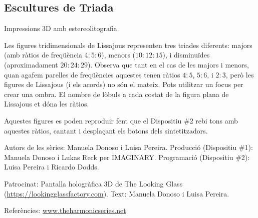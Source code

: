 \subsection{Escultures de Triada}
Impressions 3D amb estereolitografia.

Les figures tridimensionals de Lissajous representen tres triades diferents: majors (amb ràtios de freqüència $4:5:6$), menors ($10:12:15$), i disminuïdes (aproximadament $20:24:29$). Observa que tant en el cas de les majors i menors, quan agafem parelles de freqüències aquestes tenen ràtios $4:5$, $5:6$, i $2:3$, però les figures de Lissajous (i els acords) no són el mateix. Pots utilitzar un focus per crear una ombra. El nombre de lòbuls a cada costat de la figura plana de Lissajous et dóna  les ràtios.

Aquestes figures es poden reproduir fent que el Dispositiu \#2 rebi tons amb aquestes ràtios, cantant i desplaçant els botons dels sintetitzadors.

\vfill

Autors de les sèries: Manuela Donoso i Luisa Pereira.
Producció (Dispositiu \#1): Manuela Donoso i Lukas Reck per IMAGINARY.
Programació (Dispositiu \#2): Luisa Pereira i Ricardo Dodds.

Patrocinat: Pantalla hologràfica 3D de The Looking Glass (\url{https://lookingglassfactory.com}).
Text: Manuela Donoso i Luisa Pereira.

Referències: \url{www.theharmonicseries.net}
